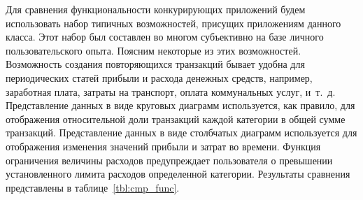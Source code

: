 Для сравнения функциональности конкурирующих приложений будем использовать
набор типичных возможностей, присущих приложениям данного класса.
Этот набор был составлен во многом субъективно на базе личного пользовательского опыта.
Поясним некоторые из этих возможностей.
Возможность создания повторяющихся транзакций бывает удобна для
периодических статей прибыли и расхода денежных средств, например,
заработная плата, затраты на транспорт, оплата коммунальных услуг, и~т.~д.
Представление данных в виде круговых диаграмм используется,
как правило, для отображения относительной доли транзакций
каждой категории в общей сумме транзакций.
Представление данных в виде столбчатых диаграмм
используется для отображения изменения значений прибыли и затрат во времени.
Функция ограничения величины расходов предупреждает пользователя
о превышении установленного лимита расходов определенной категории.
Результаты сравнения представлены в таблице~\ref{tbl:cmp_func}.

